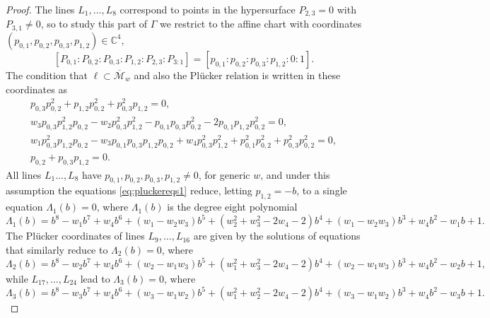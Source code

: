 \documentclass[10pt,a4paper]{amsart}
\newcommand{\C}{\mathbb{C}}
\begin{document}
\begin{proof}
The lines $L_1,\dots,L_8$ correspond to points in the hypersurface $P_{2,3}=0$ with $P_{3,1}\neq0$, so to study this part of $\Gamma$ we restrict to the affine chart with coordinates $(p_{0,1},p_{0,2},p_{0,3},p_{1,2})\in\C^4$, 
$$[P_{0,1}:P_{0,2}:P_{0,3}:P_{1,2}:P_{2,3}:P_{3:1}] = [p_{0,1}:p_{0,2}:p_{0,3}:p_{1,2}:0:1].$$
The condition that $\ell\subset \overline{\mathcal{M}}_w$ and also the Pl\"ucker relation is written in these coordinates as
\begin{equation} \label{eq:pluckereqs1}
    \begin{gathered}
        p_{0,3} p_{0,2}^2+p_{1,2} p_{0,2}^2+p_{0,3}^2 p_{1,2} =0, \\
        w_3 p_{0,3} p_{1,2}^2 p_{0,2}-w_2 p_{0,3}^2 p_{1,2}^2-p_{0,1} p_{0,3} p_{0,2}^2-2 p_{0,1} p_{1,2} p_{0,2}^2=0,\\
        w_1 p_{0,3}^2 p_{1,2} p_{0,2}-w_3 p_{0,1} p_{0,3} p_{1,2} p_{0,2}+w_4 p_{0,3}^2 p_{1,2}^2+p_{0,1}^2 p_{0,2}^2+p_{0,3}^2 p_{0,2}^2=0,\\
        p_{0,2}+p_{0,3} p_{1,2} = 0.
    \end{gathered}
\end{equation}
All lines $L_1\dots,L_8$ have $p_{0,1},p_{0,2},p_{0,3},p_{1,2}\neq 0$, for generic $w$, and under this assumption the equations \eqref{eq:pluckereqs1} reduce, letting $p_{1,2}=-b$, to a single equation $\Lambda_1(b)=0$, where $\Lambda_1(b)$ is the degree eight polynomial
\begin{equation} \label{pvi:Lambda1}
    \Lambda_1(b)= b^8-w_1b^7 +w_4 b^6 + (w_1- w_2 w_3) b^5+ (w_2^2 +w_3^2-2w_4-2) b^4 +(w_1- w_2 w_3)b^3+ w_4 b^2- w_1 b+1.
\end{equation}
The Pl\"ucker coordinates of lines $L_9,\dots,L_{16}$ are given by the solutions of equations that similarly reduce to $\Lambda_2(b)=0$, where 
\begin{equation} \label{pvi:Lambda2}
    \Lambda_2(b)= b^8-w_2b^7 +w_4b^6 + (w_2 - w_1 w_3) b^5+(w_1^2+ w_3^2-2w_4-2)b^4+(w_2- w_1 w_3)b^3+ w_4 b^2 - w_2 b+1,
\end{equation}
while $L_{17},\dots,L_{24}$ lead to $\Lambda_3(b)=0$, where 
\begin{equation} \label{pvi:Lambda3}
    \Lambda_3(b)= b^8-w_3b^7 + w_4 b^6+ (w_3  - w_1 w_2) b^5+( w_1^2+ w_2^2-2  w_4-2)b^4 +(  w_3-w_1 w_2)b^3+ w_4 b^2 - w_3b+1.
\end{equation}


\end{proof}
\end{document}
